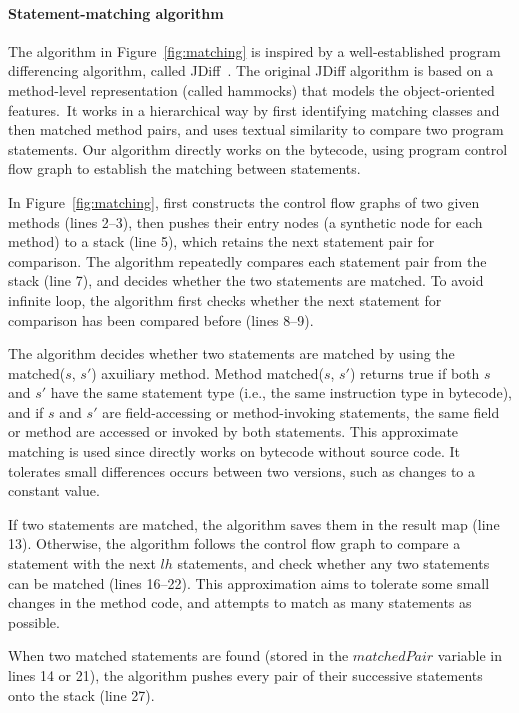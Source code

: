 \paragraph{Statement-matching algorithm}

The algorithm in Figure~\ref{fig:matching} is inspired by
a well-established program differencing algorithm, called
JDiff~\cite{Apiwattanapong:2004}. The original JDiff
algorithm is based on a method-level representation
(called hammocks) that models the object-oriented features.\
It works in a hierarchical way by first identifying matching
classes and then matched method pairs, and uses
textual similarity to compare two program statements. Our
algorithm directly works on the bytecode, using program control flow graph
to establish the matching between statements.

In Figure~\ref{fig:matching}, \ourtool first constructs the control
flow graphs of two given methods (lines 2--3), then pushes their
entry nodes (a synthetic node for each method) to a stack (line 5), which retains
the next statement pair for comparison. The algorithm repeatedly
compares each statement pair from the stack (line 7), and
decides whether the two statements are matched.  To avoid infinite
loop, the algorithm first checks whether the next statement for comparison
has been compared before (lines 8--9). 

The algorithm decides whether two statements are matched by using
the matched($\mathit{s}$, $\mathit{s'}$) axuiliary method. Method
matched($\mathit{s}$, $\mathit{s'}$) returns true if both
$\mathit{s}$ and $\mathit{s'}$ have the same statement type (i.e.,
the same instruction type in bytecode), and if $\mathit{s}$ and
$\mathit{s'}$ are field-accessing or method-invoking statements,
the same field or method are accessed or invoked by both statements.
This approximate matching is used since \ourtool directly works
on bytecode without source code. It tolerates small differences
occurs between two versions, such as changes to a constant value.


If two statements are matched, the algorithm saves them in the
result map (line 13). Otherwise,
the algorithm follows the control flow graph to compare a statement with
the next $lh$ statements, and check whether any two statements can be
matched (lines 16--22). This approximation aims to tolerate some small
changes in the method code, and attempts to match as many statements as possible.

When two matched statements are found  (stored in
the $\mathit{matchedPair}$ variable in lines 14 or 21),
the algorithm pushes every pair of
their successive statements onto the stack (line 27).



